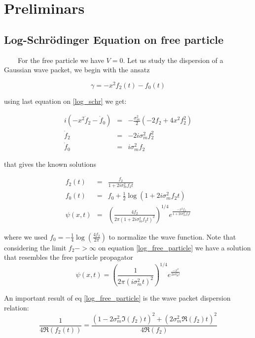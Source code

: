 \documentclass[a4paper,12pt]{article}
\begin{document}

\section{Preliminars}

\subsection{Log-Schr\"odinger Equation on free particle}

~~~~For the free particle we have $V=0$. Let us study the dispersion of a Gaussian wave packet, we begin with the ansatz

\begin{equation}
\gamma = -x^2 f_2(t) - f_0(t)
\end{equation}

using last equation on \ref{log_schr} we get:

\begin{eqnarray}
i \left( -x^2 \dot f_2 - \dot f_0 \right) &=& - \frac{\sigma_m^2}{2} \left( -2 f_2 + 4 x^2 f_2^2 \right)  \nonumber \\
\dot f_2 & = & - 2 i \sigma_m^2 f_2^2 \\
\dot f_0 & = &   i \sigma_m^2 f_2
\end{eqnarray}

that gives the known solutions

\begin{eqnarray}\label{log_free_particle}
f_2(t) & = & \frac{f_2}{1 + 2i \sigma_m^2 f_2 t}  \\
f_0(t) & = & f_0 + \frac{1}{2} \log \left( 1 + 2i \sigma_m^2 f_2 t \right) \\
\psi(x,t) & = & \left( \frac{4 f_2}{2\pi \left( 1 + 2i \sigma_m^2 f_2 t  \right)^{2} } \right)^{1/4} e^{ \frac{-x^2 f_2}{ 
1 + 2i \sigma_m^2 f_2 t} } 
\end{eqnarray}

where we used $ f_0  = - \frac{1}{4} \log \left( \frac{4 f_2}{2 \pi} \right)$ to normalize the wave function. Note that considering the limit 
$f_2->\infty$  on equation \ref{log_free_particle} we have a solution that resembles the free particle propagator
\begin{equation}
\psi(x,t) =   \left( \frac{1}{2\pi \left( i \sigma_m^2 t  \right)^{2} } \right)^{1/4} e^{ \frac{-x^2}{2i \sigma_m^2 t} } 
\end{equation}

An important result of eq \ref{log_free_particle} is the wave packet dispersion relation:
\begin{equation}\label{dispersion_free_particle}
\frac{1}{4\Re(f_2(t))}  = \frac{ (1-2\sigma_m^2\Im(f_2)t)^2 + (2\sigma_m^2\Re(f_2)t)^2}{  4 \Re(f_2)  }
\end{equation}
\end{document}
